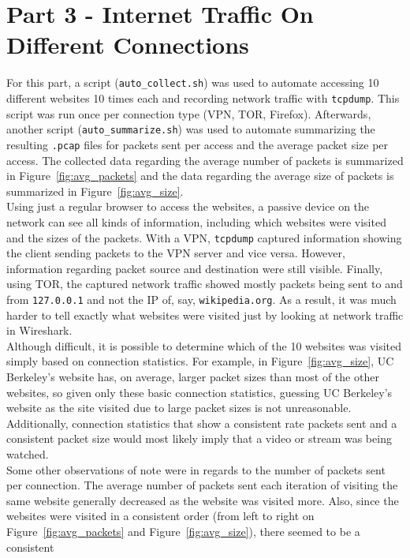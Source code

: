\documentclass[11pt]{article}
\begin{document}
\section*{Part 3 - Internet Traffic On Different Connections}
For this part, a script (\verb|auto_collect.sh|) was used to automate accessing 10 different
websites 10 times each and recording network traffic with \verb|tcpdump|. This script was run
once per connection type (VPN, TOR, Firefox). Afterwards, another script (\verb|auto_summarize.sh|)
was used to automate summarizing the resulting \verb|.pcap| files for packets sent per access
and the average packet size per access. The collected data regarding the average number of packets
is summarized in Figure~\ref{fig:avg_packets} and the data regarding the average size of packets
is summarized in Figure~\ref{fig:avg_size}.\\
Using just a regular browser to access the websites, a passive device on the network can see
all kinds of information, including which websites were visited and the sizes of the packets. With a
VPN, \verb|tcpdump| captured information showing the client sending packets to the VPN server and
vice versa. However, information regarding packet source and destination were still visible. Finally,
using TOR, the captured network traffic showed mostly packets being sent to and from \verb|127.0.0.1|
and not the IP of, say, \verb|wikipedia.org|. As a result, it was much harder to tell exactly what
websites were visited just by looking at network traffic in Wireshark.\\
Although difficult, it is possible to determine which of the 10 websites was visited simply based on
connection statistics. For example, in Figure~\ref{fig:avg_size}, UC Berkeley's website has, on average,
larger packet sizes than most of the other websites, so given only these basic connection statistics,
guessing UC Berkeley's website as the site visited due to large packet sizes is not unreasonable.
Additionally, connection statistics that show a consistent rate packets sent and a consistent packet
size would most likely imply that a video or stream was being watched.\\
Some other observations of note were in regards to the number of packets sent per connection. The 
average number of packets sent each iteration of visiting the same website generally decreased as the
website was visited more. Also, since the websites were visited in a consistent order (from left to 
right on Figure~\ref{fig:avg_packets} and Figure~\ref{fig:avg_size}), there seemed to be a consistent
\end{document}
